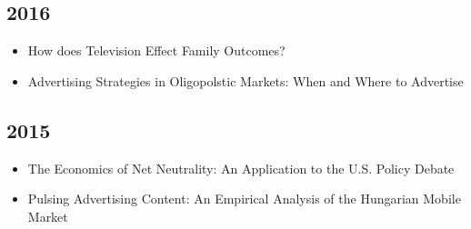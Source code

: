 \documentclass[]{article}
\providecommand{\tightlist}{%
  \setlength{\itemsep}{0pt}\setlength{\parskip}{0pt}}
\begin{document}
\subsection{2016}\label{section-4}

\begin{itemize}
\tightlist
\item
  How does Television Effect Family Outcomes?
\item
  Advertising Strategies in Oligopolstic Markets: When and Where to
  Advertise
\end{itemize}

\subsection{2015}\label{section-5}

\begin{itemize}
\tightlist
\item
  The Economics of Net Neutrality: An Application to the U.S. Policy
  Debate
\item
  Pulsing Advertising Content: An Empirical Analysis of the Hungarian
  Mobile Market
\end{itemize}
\end{document}
